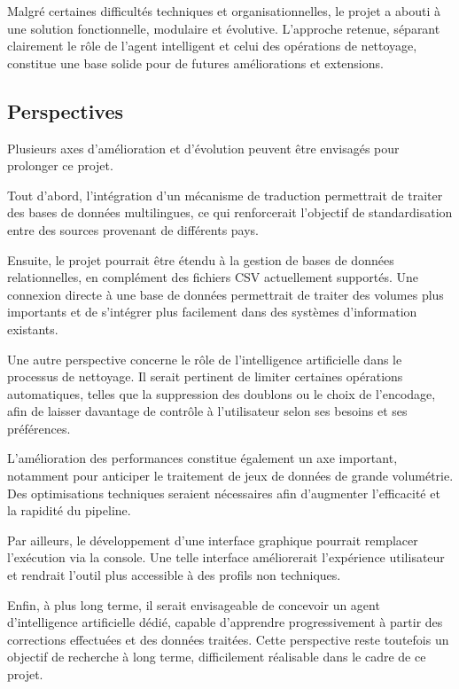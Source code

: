 \documentclass[a4paper, 12pt, twoside]{article}
\begin{document}
Malgré certaines difficultés techniques et organisationnelles, le projet a abouti à une solution fonctionnelle, modulaire et évolutive. L’approche retenue, séparant clairement le rôle de l’agent intelligent et celui des opérations de nettoyage, constitue une base solide pour de futures améliorations et extensions.

	\subsection{Perspectives}
Plusieurs axes d’amélioration et d’évolution peuvent être envisagés pour prolonger ce projet.

Tout d’abord, l’intégration d’un mécanisme de traduction permettrait de traiter des bases de données multilingues, ce qui renforcerait l’objectif de standardisation entre des sources provenant de différents pays.

Ensuite, le projet pourrait être étendu à la gestion de bases de données relationnelles, en complément des fichiers CSV actuellement supportés. Une connexion directe à une base de données permettrait de traiter des volumes plus importants et de s’intégrer plus facilement dans des systèmes d’information existants.

Une autre perspective concerne le rôle de l’intelligence artificielle dans le processus de nettoyage. Il serait pertinent de limiter certaines opérations automatiques, telles que la suppression des doublons ou le choix de l’encodage, afin de laisser davantage de contrôle à l’utilisateur selon ses besoins et ses préférences.

L’amélioration des performances constitue également un axe important, notamment pour anticiper le traitement de jeux de données de grande volumétrie. Des optimisations techniques seraient nécessaires afin d’augmenter l’efficacité et la rapidité du pipeline.

Par ailleurs, le développement d’une interface graphique pourrait remplacer l’exécution via la console. Une telle interface améliorerait l’expérience utilisateur et rendrait l’outil plus accessible à des profils non techniques.

Enfin, à plus long terme, il serait envisageable de concevoir un agent d’intelligence artificielle dédié, capable d’apprendre progressivement à partir des corrections effectuées et des données traitées. Cette perspective reste toutefois un objectif de recherche à long terme, difficilement réalisable dans le cadre de ce projet.

\newpage
\end{document}
